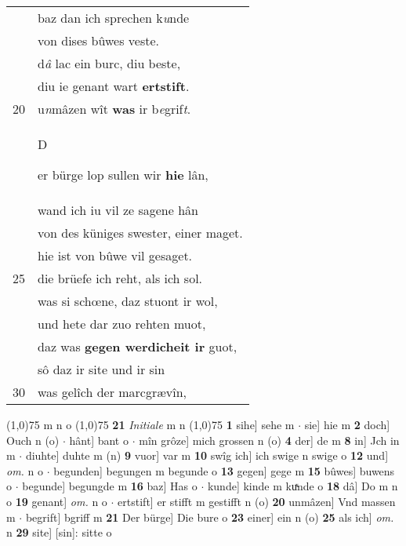 \documentclass[8pt,a4paper,notitlepage]{article}
\begin{document}
\begin{table}[ht]
\begin{minipage}[t]{0.5\linewidth}
\begin{tabular}{rl}
 & baz dan ich sprechen k\textit{u}nde\\ 
 & von dises bûwes veste.\\ 
 & d\textit{â} lac ein burc, diu beste,\\ 
 & diu ie genant wart \textbf{ertstift}.\\ 
20 & u\textit{n}mâzen wît \textbf{was} ir b\textit{e}grif\textit{t}.\\ 
 & \begin{large}D\end{large}er bürge lop sullen wir \textbf{hie} lân,\\ 
 & wand ich iu vil ze sagene hân\\ 
 & von des küniges swester, einer maget.\\ 
 & hie ist von bûwe vil gesaget.\\ 
25 & die brüefe ich reht, als ich sol.\\ 
 & was si schœne, daz stuont ir wol,\\ 
 & und hete dar zuo rehten muot,\\ 
 & daz was \textbf{gegen werdicheit ir} guot,\\ 
 & sô daz ir site und ir sin\\ 
30 & was gelîch der marcgrævîn,\\ 
\end{tabular}
\scriptsize
\line(1,0){75} \newline
m n o \newline
\line(1,0){75} \newline
\textbf{21} \textit{Initiale} m n  \newline
\line(1,0){75} \newline
\textbf{1} sihe] sehe m  $\cdot$ sie] hie m \textbf{2} doch] Ouch n (o)  $\cdot$ hânt] bant o  $\cdot$ mîn grôze] mich grossen n (o) \textbf{4} der] de m \textbf{8} in] Jch in m  $\cdot$ diuhte] duhte m (n) \textbf{9} vuor] var m \textbf{10} swîg ich] ich swige n swige o \textbf{12} und] \textit{om.} n o  $\cdot$ begunden] begungen m begunde o \textbf{13} gegen] gege m \textbf{15} bûwes] buwens o  $\cdot$ begunde] begungde m \textbf{16} baz] Has o  $\cdot$ kunde] kinde m kuͯnde o \textbf{18} dâ] Do m n o \textbf{19} genant] \textit{om.} n o  $\cdot$ ertstift] er stifft m gestifft n (o) \textbf{20} unmâzen] Vnd massen m  $\cdot$ begrift] bgriff m \textbf{21} Der bürge] Die bure o \textbf{23} einer] ein n (o) \textbf{25} als ich] \textit{om.} n \textbf{29} site] [sin]: sitte o \newline
\end{minipage}
\end{table}
\end{document}
